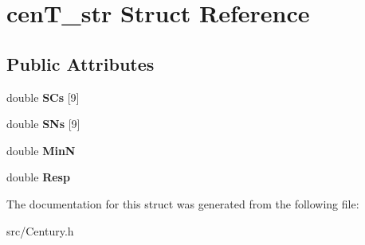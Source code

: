 \hypertarget{structcen_t__str}{\section{cen\-T\-\_\-str Struct Reference}
\label{structcen_t__str}
}
\subsection*{Public Attributes}
\begin{DoxyCompactItemize}
\item 
\hypertarget{structcen_t__str_a7cc6c306f61853331075b4c3180e3505}{double {\bfseries S\-Cs} \mbox{[}9\mbox{]}}\label{structcen_t__str_a7cc6c306f61853331075b4c3180e3505}

\item 
\hypertarget{structcen_t__str_a942f4f70002c67e0c863af3ea9a0a31f}{double {\bfseries S\-Ns} \mbox{[}9\mbox{]}}\label{structcen_t__str_a942f4f70002c67e0c863af3ea9a0a31f}

\item 
\hypertarget{structcen_t__str_a5df0830365c4cc714439d77584be02dd}{double {\bfseries Min\-N}}\label{structcen_t__str_a5df0830365c4cc714439d77584be02dd}

\item 
\hypertarget{structcen_t__str_acb6fd58d22ab79190c87c0871c12bad2}{double {\bfseries Resp}}\label{structcen_t__str_acb6fd58d22ab79190c87c0871c12bad2}

\end{DoxyCompactItemize}


The documentation for this struct was generated from the following file\-:\begin{DoxyCompactItemize}
\item 
src/Century.\-h\end{DoxyCompactItemize}
